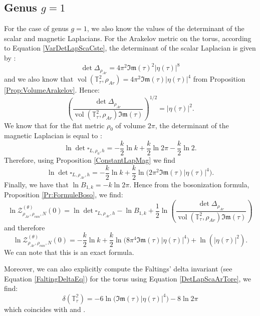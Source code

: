\documentclass{article}
\theoremstyle{definition}
\theoremstyle{remark}
\DeclareMathOperator{\vol}{vol}
\begin{document}
\subsection{Genus $g=1$}
For the case of genus $g=1$, we also know the values of the determinant of the scalar and magnetic Laplacians. For the Arakelov metric on the torus, according to Equation \eqref{VarDetLapScaCste}, the determinant of the scalar Laplacian is given by \cite{OSGOOD1988148}:
\begin{equation}\label{DetLapScaArTore}
    \det \Delta_{\rho_{Ar}}=4\pi^{2}\mathfrak{Im}(\tau)^{2}|\eta(\tau)|^{8}
\end{equation} and we also know that  $\vol(\mathbb{T}^{2}_{\tau},\rho_{Ar})=4\pi^{2}\mathfrak{Im}(\tau)|\eta(\tau)|^{4}$ from Proposition \ref{Prop:VolumeArakelov}.
Hence: $$\left(\frac{\det\Delta_{\rho_{Ar}}}{\vol(\mathbb{T}^{2}_{\tau},\rho_{Ar})\mathfrak{Im}(\tau)}\right)^{1/2}=|\eta(\tau)|^{2}.$$ 
We know that for the flat metric $\rho_{0}$ of volume $2\pi$, the determinant of the magnetic Laplacian is equal to \cite{BerthomieuAnalyticTorsion}: $$\ln\det\square_{L,\rho_{0},h}=-\frac{k}{2}\ln k+\frac{k}{2}\ln2\pi-\frac{k}{2}\ln2.$$
Therefore, using Proposition \ref{ConstantLapMag} we find $$\ln \det\square_{L,\rho_{Ar},h}=-\frac{k}{2}\ln k+\frac{k}{2}\ln\big(
2\pi^{2}\mathfrak{Im}(\tau) |\eta(\tau)|^{4} \big).$$
Finally, we have that $\ln B_{1,k}=-k\ln2\pi.$ Hence from the bosonization formula, Proposition \ref{Pr:FormuleBoso}, we find: $$\ln \mathcal{Z}_{\rho_{Ar},\rho_{can},N}^{(\theta)}(0)=\ln\det\square_{L,\rho_{Ar},h}-\ln B_{1,k}+\frac{1}{2}\ln \left(\frac{\det\Delta_{\rho_{Ar}}}{\vol(\mathbb{T}^{2}_{\tau},\rho_{Ar})\mathfrak{Im}(\tau)} \right)$$ and therefore
\begin{equation}
    \ln \mathcal{Z}_{\rho_{Ar},\rho_{can},N}^{(\theta)}(0)=-\frac{k}{2}\ln k+\frac{k}{2}\ln\big(
8\pi^{4}\mathfrak{Im}(\tau) |\eta(\tau)|^{4} \big)+\ln(|\eta(\tau)|^{2}).
\end{equation}
We can note that this is an exact formula.

Moreover, we can also explicitly compute the Faltings' delta invariant (see Equation \eqref{FaltingDeltaEq}) for the torus using Equation \eqref{DetLapScaArTore}, we find: \begin{equation}\label{Eq:FaltingsTore}\delta(\mathbb{T^{2}_{\tau}})=-6\ln \big( \mathfrak{Im}(\tau)|\eta(\tau)|^{4} \big)-8\ln2\pi\end{equation} which coincides with \cite[p. 252]{Jorgenson1990AsymptoticBehaviorFaltingDelta} and \cite[p. 417]{FaltingsCalculusArithmeticSurface1984}.
\end{document}
